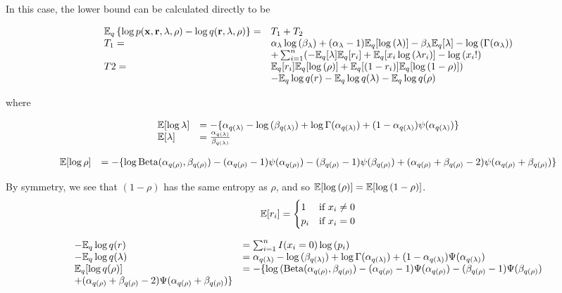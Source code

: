 \documentclass{amsart}
\begin{document}
In this case, the lower bound can be calculated directly to be

$$
\begin{array}{ll}
{\mathbb E}_q \left\{ \log{p({\bf x}, {\bf r}, \lambda, \rho)} - \log{q({\bf r}, \lambda, \rho)} \right\} =& T_1 + T_2 \\
T_1 =&
\alpha_\lambda \log{(\beta_\lambda)} + (\alpha_\lambda - 1) {\mathbb E}_q[\log{(\lambda)}] - \beta_\lambda {\mathbb E}_q [\lambda] - \log{(\Gamma(\alpha_\lambda))} \\
&+ \sum_{i=1}^n ( -{\mathbb E}_q [\lambda] {\mathbb E}_q [r_i] + {\mathbb E}_q[x_i \log{(\lambda r_i)}] - \log{(x_i!)} \\
T2 =&{\mathbb E}_q[r_i] {\mathbb E}_q[\log{(\rho)}] + {\mathbb E}_q[(1 - r_i)] {\mathbb E}_q[\log{(1 - \rho)}] ) \\
& - {\mathbb E}_q \log{q(r)} - {\mathbb E}_q \log{q(\lambda)} - {\mathbb E}_q \log{q(\rho)}
\end{array}
$$

where

$$
\begin{array}{ll}
{\mathbb E} [\log{\lambda}] &= -\{ \alpha_{q(\lambda)} - \log{(\beta_{q(\lambda)})} + \log{\Gamma(\alpha_{q(\lambda)})} + (1 - \alpha_{q(\lambda)}) \psi{(\alpha_{q(\lambda)})} \} \\
{\mathbb E} [\lambda] &= \frac{\alpha_{q(\lambda)}}{\beta_{q(\lambda)}} \\
\end{array}
$$

$$
\begin{array}{ll}
{\mathbb E}[\log{\rho}] &= -\{ \log{\text{Beta}(\alpha_{q(\rho)}, \beta_{q(\rho)})} - (\alpha_{q(\rho)} - 1) \psi{(\alpha_{q(\rho)})} - (\beta_{q(\rho)} - 1)\psi{(\beta_{q(\rho)})} + (\alpha_{q(\rho)} + \beta_{q(\rho)} - 2)\psi{(\alpha_{q(\rho)} + \beta_{q(\rho)})} \} \\
\end{array}
$$

By symmetry, we see that $(1 - \rho)$ has the same entropy as $\rho$,
and so ${\mathbb E} [\log{(\rho)}] = {\mathbb E} [\log{(1 - \rho)}]$.
$$
{\mathbb E}[r_i] = 
	\begin{cases}
	1 & \text{if } x_i \ne 0 \\
	p_i & \text{if } x_i = 0 \\
	\end{cases}
$$

$$
\begin{array}{ll}
-{\mathbb E}_q \log{q(r)} &= \sum_{i=1}^n I(x_i = 0) \log{(p_i)} \\
-{\mathbb E}_q \log{q(\lambda)} &= \alpha_{q(\lambda)} - \log{(\beta_{q(\lambda)})} + \log{\Gamma{(\alpha_{q(\lambda)})}} + (1 - \alpha_{q(\lambda)}) \Psi{(\alpha_{q(\lambda)})} \\
{\mathbb E}_q[\log{q(\rho)}] &= - \{ \log{(\text{Beta}(\alpha_{q(\rho)}, \beta_{q(\rho)})} - (\alpha_{q(\rho)} - 1) \Psi{(\alpha_{q(\rho)})} - (\beta_{q(\rho)} - 1)\Psi{(\beta_{q(\rho)})} \\
+ (\alpha_{q(\rho)} + \beta_{q(\rho)} - 2)\Psi{(\alpha_{q(\rho)} + \beta_{q(\rho)})} \} \\
\end{array}
$$
\end{document}
